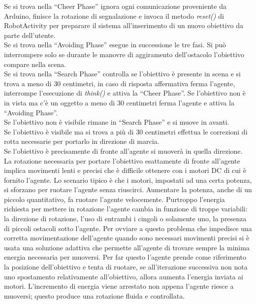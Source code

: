 Se si trova nella ``Cheer Phase'' ignora ogni comunicazione proveniente da 
Arduino, finisce la rotazione di segnalazione e invoca il metodo \emph{reset()} di 
RobotActivity per preparare il sistema all'inserimento di un nuovo obiettivo da 
parte dell'utente.\\
Se si trova nella ``Avoiding Phase'' esegue in successione le tre fasi. 
Si può interrompere solo se durante le manovre di aggiramento dell'ostacolo
l'obiettivo compare nella scena.\\
Se si trova nella ``Search Phase'' controlla se l'obiettivo è presente in scena e 
si trova a meno di 30 centimetri, in caso di risposta affermativa ferma l'agente,
interrompe l'esecuzione di \emph{think()} e attiva la ``Cheer Phase''. 
Se l'obiettivo non è in vista ma c'è un oggetto a meno di 30 centimetri ferma l'agente
e attiva la ``Avoiding Phase''.\\
Se l'obiettivo non è visibile rimane in ``Search Phase'' e si muove in avanti.\\
Se l'obiettivo è visibile ma si trova a più di 30 centimetri effettua le correzioni di rotta
necessarie per portarlo in direzione di marcia.\\
Se l'obiettivo è precisamente di fronte all'agente si muoverà in quella direzione.\\ 
La rotazione necessaria per portare l'obiettivo esattamente di fronte all'agente 
implica movimenti lenti e precisi che è difficile ottenere con i motori DC di cui è
fornito l'agente. Lo scenario tipico è che i motori, impostati ad una certa potenza, 
si sforzano per ruotare l'agente senza riuscirci. Aumentare la potenza, anche di un piccolo 
quantitativo, fa ruotare l'agente velocemente. Purtroppo l'energia richiesta per 
mettere in rotazione l'agente cambia in funzione di troppe variabili: 
la direzione di rotazione, l'uso di entrambi i cingoli o solamente uno, 
la presenza di piccoli ostacoli sotto l'agente. Per ovviare a questo problema che impedisce 
una corretta movimentazione dell'agente quando sono necessari movimenti precisi 
si è usata una soluzione adattiva che permette all'agente di trovare sempre la 
minima energia necessaria per muoversi. Per far questo l'agente prende come riferimento 
la posizione dell'obiettivo e tenta di ruotare, se all'iterazione successiva 
non nota uno spostamento relativamente all'obiettivo, allora aumenta 
l'energia inviata ai motori. L'incremento di energia viene arrestato non appena 
l'agente riesce a muoversi; questo produce una rotazione fluida e controllata.

